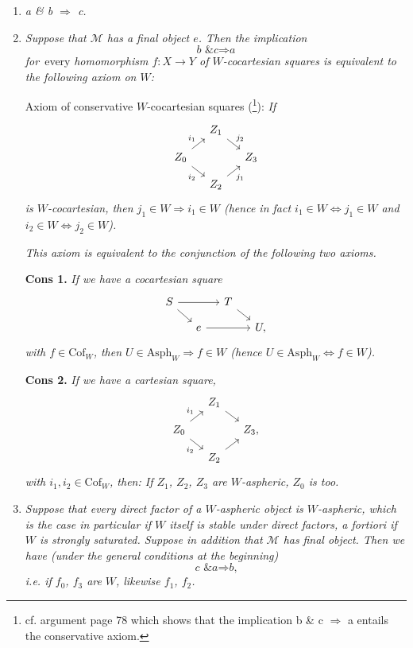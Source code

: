 \documentclass[11pt]{article}
\newcommand{\printedpage}[1]{\marginpar{\footnotesize p.~#1}}
\newcommand{\msp}[1]{\marginpar{\footnotesize [#1]}}
\newcommand{\Asph}{\mathrm{Asph}}
\newcommand{\Cof}{\mathrm{Cof}}
\begin{document}
\begin{enumerate}
\item[\textit{1°)}] \textit{a \& b $\Longrightarrow$ c.}

\msp{page 273}

\item[\textit{2°)}] \textit{Suppose that $\mathcal{M}$ has a final object $e$. Then the implication}
\[
\textit{b \& c} \Longrightarrow \textit{a}
\]
\textit{for}~every \textit{homomorphism $f : X \longrightarrow Y$ of $W$-cocartesian squares is equivalent to the following axiom on $W$:}

Axiom of conservative $W$-cocartesian squares (\footnote{cf. argument page 78 which shows that the implication b \& c $\Longrightarrow$ a entails the conservative axiom.}): \textit{If}
\[
\begin{tikzcd}[ampersand replacement=\&, column sep=small, row sep=small]
 \& Z_1 \arrow[dr, "j_2"] \& \\
Z_0 \arrow[ur, "i_1"] \arrow[dr, "i_2"'] \& \& Z_3 \\
 \& Z_2 \arrow[ur, "j_1"'] \&
\end{tikzcd}
\]
\textit{is $W$-cocartesian, then $j_1 \in W \Longrightarrow i_1 \in W$ (hence in fact $i_1 \in W \Longleftrightarrow j_1 \in W$ and $i_2 \in W \Longleftrightarrow j_2 \in W$).}

\textit{This axiom is equivalent to the conjunction of the following two axioms.}

\textbf{Cons 1.} \textit{If we have a cocartesian square}
\printedpage{178}
\[
\begin{tikzcd}[ampersand replacement=\&, column sep=small, row sep=small]
S \arrow[rr] \arrow[dr] \& \& T \arrow[dr] \& \\
 \& e \arrow[rr] \& \& U,
\end{tikzcd}
\]
\textit{with $f \in \Cof_W$, then $U \in \Asph_W \Longrightarrow f \in W$ (hence $U \in \Asph_W \Longleftrightarrow f \in W$).}

\textbf{Cons 2.} \textit{If we have a cartesian square,}
\[
\begin{tikzcd}[ampersand replacement=\&, column sep=small, row sep=small]
 \& Z_1 \arrow[dr] \& \\
Z_0 \arrow[ur, "i_1"] \arrow[dr, "i_2"'] \& \& Z_3, \\
 \& Z_2 \arrow[ur] \&
\end{tikzcd}
\]
\textit{with $i_1, i_2 \in \Cof_W$, then: If $Z_1$, $Z_2$, $Z_3$ are $W$-aspheric, $Z_0$ is too.}

\msp{page 274}

\item[\textit{3°)}] \textit{Suppose that every direct factor of a $W$-aspheric object is $W$-aspheric, which is the case in particular if $W$ itself is stable under direct factors, a fortiori if $W$ is strongly saturated. Suppose in addition that $\mathcal{M}$ has} \textit{final object. Then we have (under the general conditions at the beginning)}
\[
\textit{c \& a} \Longrightarrow \textit{b,}
\]
\textit{i.e. if $f_0$, $f_3$ are} \textit{$W$, likewise $f_1$, $f_2$.}
\end{enumerate}
\end{document}

